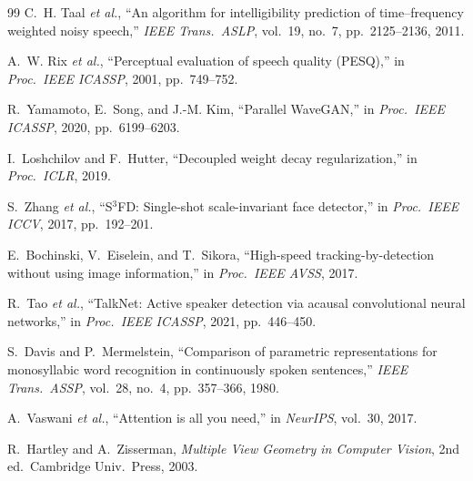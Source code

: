 \documentclass[journal,10pt]{IEEEtran}
\begin{document}
\begin{thebibliography}{99}
 C.~H. Taal \emph{et al.}, ``An algorithm for intelligibility prediction of time--frequency weighted noisy speech,'' \emph{IEEE Trans.\ ASLP}, vol.~19, no.~7, pp.~2125--2136, 2011.

 A.~W. Rix \emph{et al.}, ``Perceptual evaluation of speech quality (PESQ),'' in \emph{Proc.\ IEEE ICASSP}, 2001, pp.~749--752.

 R.~Yamamoto, E.~Song, and J.-M. Kim, ``Parallel WaveGAN,'' in \emph{Proc.\ IEEE ICASSP}, 2020, pp.~6199--6203.

 I.~Loshchilov and F.~Hutter, ``Decoupled weight decay regularization,'' in \emph{Proc.\ ICLR}, 2019.

 S.~Zhang \emph{et al.}, ``S\(^3\)FD: Single-shot scale-invariant face detector,'' in \emph{Proc.\ IEEE ICCV}, 2017, pp.~192--201.

 E.~Bochinski, V.~Eiselein, and T.~Sikora, ``High-speed tracking-by-detection without using image information,'' in \emph{Proc.\ IEEE AVSS}, 2017.

 R.~Tao \emph{et al.}, ``TalkNet: Active speaker detection via acausal convolutional neural networks,'' in \emph{Proc.\ IEEE ICASSP}, 2021, pp.~446--450.

 S.~Davis and P.~Mermelstein, ``Comparison of parametric representations for monosyllabic word recognition in continuously spoken sentences,'' \emph{IEEE Trans.\ ASSP}, vol.~28, no.~4, pp.~357--366, 1980.

 A.~Vaswani \emph{et al.}, ``Attention is all you need,'' in \emph{NeurIPS}, vol.~30, 2017.

 R.~Hartley and A.~Zisserman, \emph{Multiple View Geometry in Computer Vision}, 2nd ed.\ Cambridge Univ.\ Press, 2003.

\end{thebibliography}
\end{document}

